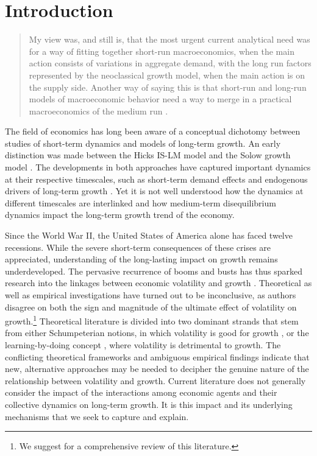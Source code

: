 \documentclass[authoryear, review]{elsarticle}
\begin{document}
\section{Introduction}

\begin{quotation}
	My view was, and still is, that the most urgent current analytical need was for a way of fitting together short-run macroeconomics, when the main action consists of variations in aggregate demand, with the long run factors represented by the neoclassical growth model, when the main action is on the supply side. Another way of saying this is that short-run and long-run models of macroeconomic behavior need a way to merge in a practical macroeconomics of the medium run \citep{Solow2005}.
\end{quotation}

The field of economics has long been aware of a conceptual dichotomy between studies of short-term dynamics and models of long-term growth. An early distinction was made between the Hicks IS-LM model \citeyearpar{Hicks1937} and the Solow growth model \citeyearpar{Solow1956}. The developments in both approaches have captured important dynamics at their respective timescales, such as short-term demand effects and endogenous drivers of long-term growth \citep[e.g.][]{AghionHowitt1992}. Yet it is not well understood how the dynamics at different timescales are interlinked and how medium-term disequilibrium dynamics impact the long-term growth trend of the economy.

Since the World War II, the United States of America alone has faced twelve recessions. While the severe short-term consequences of these crises are appreciated, understanding of the long-lasting impact on growth remains underdeveloped. %
The pervasive recurrence of booms and busts has thus sparked research into the linkages between economic volatility and growth \citep{CooleyPrescott1995,AghionHowitt2006, PriesmeierStahler2011, BakasEtAl2019}. Theoretical as well as empirical investigations have turned out to be inconclusive, as authors disagree on both the sign and magnitude of the ultimate effect of volatility on growth.\footnote{
    We suggest \citet{BakasEtAl2019} for a comprehensive review of this literature.
} Theoretical literature is divided into two dominant strands that stem from either Schumpeterian notions, in which volatility is good for growth \citep[based on][]{Schumpeter1939, Schumpeter1942}, or the learning-by-doing concept \citep[based on][]{Arrow1962}, where volatility is detrimental to growth. The conflicting theoretical frameworks and ambiguous empirical findings indicate that new, alternative approaches may be needed to decipher the genuine nature of the relationship between volatility and growth. Current literature does not generally consider the impact of the interactions among economic agents and their collective dynamics on long-term growth. It is this impact and its underlying mechanisms that we seek to capture and explain. 
\end{document}
